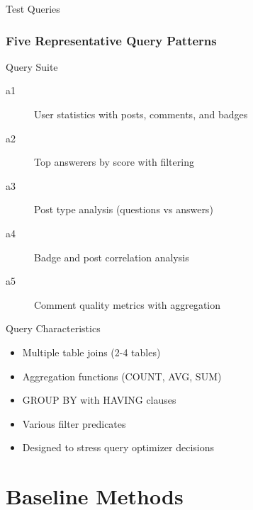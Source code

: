 \documentclass[smaller]{beamer}
\begin{document}
\begin{frame}{Test Queries}
\frametitle{Five Representative Query Patterns}

\begin{block}{Query Suite}
\begin{description}
    \item[a1] User statistics with posts, comments, and badges
    \item[a2] Top answerers by score with filtering
    \item[a3] Post type analysis (questions vs answers)
    \item[a4] Badge and post correlation analysis
    \item[a5] Comment quality metrics with aggregation
\end{description}
\end{block}

\begin{exampleblock}{Query Characteristics}
\begin{itemize}
    \item Multiple table joins (2-4 tables)
    \item Aggregation functions (COUNT, AVG, SUM)
    \item GROUP BY with HAVING clauses
    \item Various filter predicates
    \item Designed to stress query optimizer decisions
\end{itemize}
\end{exampleblock}


\end{frame}

\section{Baseline Methods}
\end{document}
